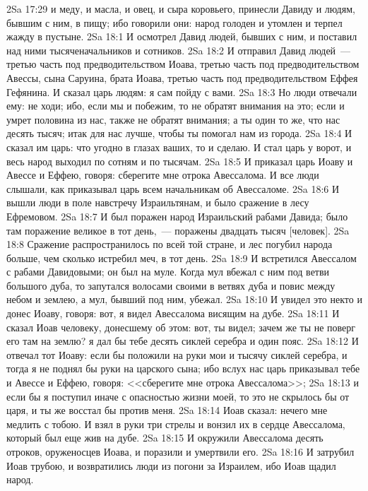 \vs 2Sa 17:29 и меду, и масла, и овец, и сыра коровьего, принесли Давиду и людям, бывшим с ним, в пищу; ибо говорили они: народ голоден и утомлен и терпел жажду в пустыне.
\vs 2Sa 18:1 И осмотрел Давид людей, бывших с ним, и поставил над ними тысяченачальников и сотников.
\vs 2Sa 18:2 И отправил Давид людей~--- третью часть под предводительством Иоава, третью часть под предводительством Авессы, сына Саруина, брата Иоава, третью часть под предводительством Еффея Гефянина. И сказал царь людям: я сам пойду с вами.
\vs 2Sa 18:3 Но люди отвечали ему: не ходи; ибо, если мы и побежим, то не обратят внимания на это; если и умрет половина из нас, также не обратят внимания; а ты один то же, что нас десять тысяч; итак для нас лучше, чтобы ты помогал нам из города.
\vs 2Sa 18:4 И сказал им царь: что угодно в глазах ваших, то и сделаю. И стал царь у ворот, и весь народ выходил по сотням и по тысячам.
\vs 2Sa 18:5 И приказал царь Иоаву и Авессе и Еффею, говоря: сберегите мне отрока Авессалома. И все люди слышали, как приказывал царь всем начальникам об Авессаломе.
\vs 2Sa 18:6 И вышли люди в поле навстречу Израильтянам, и было сражение в лесу Ефремовом.
\vs 2Sa 18:7 И был поражен народ Израильский рабами Давида; было там поражение великое в тот день,~--- поражены двадцать тысяч [человек].
\vs 2Sa 18:8 Сражение распространилось по всей той стране, и лес погубил народа больше, чем сколько истребил меч, в тот день.
\vs 2Sa 18:9 И встретился Авессалом с рабами Давидовыми; он был на муле. Когда мул вбежал с ним под ветви большого дуба, то  запутался волосами своими в ветвях дуба и повис между небом и землею, а мул, бывший под ним, убежал.
\vs 2Sa 18:10 И увидел это некто и донес Иоаву, говоря: вот, я видел Авессалома висящим на дубе.
\vs 2Sa 18:11 И сказал Иоав человеку, донесшему об этом: вот, ты видел; зачем же ты не поверг его там на землю? я дал бы тебе десять сиклей серебра и один пояс.
\vs 2Sa 18:12 И отвечал тот Иоаву: если бы положили на руки мои и тысячу сиклей серебра, и тогда я не поднял бы руки на царского сына; ибо вслух нас царь приказывал тебе и Авессе и Еффею, говоря: <<сберегите мне отрока Авессалома>>;
\vs 2Sa 18:13 и если бы я поступил иначе с опасностью жизни моей, то это не скрылось бы от царя, и ты же восстал бы против меня.
\vs 2Sa 18:14 Иоав сказал: нечего мне медлить с тобою. И взял в руки три стрелы и вонзил их в сердце Авессалома, который был еще жив на дубе.
\vs 2Sa 18:15 И окружили Авессалома десять отроков, оруженосцев Иоава, и поразили и умертвили его.
\vs 2Sa 18:16 И затрубил Иоав трубою, и возвратились люди из погони за Израилем, ибо Иоав щадил народ.
